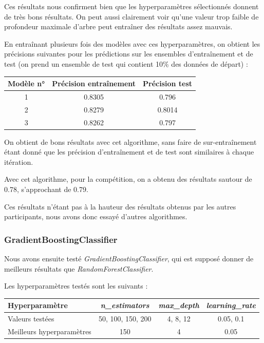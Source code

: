 \documentclass[a4paper]{article}
\begin{document}
    Ces résultats nous confirment bien que les hyperparamètres sélectionnés donnent de très bons résultats.
    On peut aussi clairement voir qu'une valeur trop faible de profondeur maximale d'arbre peut entraîner
    des résultats assez mauvais.

    En entraînant plusieurs fois des modèles avec ces hyperparamètres, on obtient les précisions suivantes pour les prédictions 
    sur les ensembles d'entraînement et de test (on prend un ensemble de test qui contient 10\% des données de départ) :

    \begin{tabular}{| *{3}{c|}}
        \hline
        Modèle n° & Précision entraînement & Précision test
        \tabularnewline
        \hline
        1 & 0.8305 & 0.796
        \tabularnewline
        \hline
        2 & 0.8279 & 0.8014
        \tabularnewline
        \hline
        3 & 0.8262 & 0.797
        \tabularnewline
        \hline
    \end{tabular}

    On obtient de bons résultats avec cet algorithme, sans faire de sur-entraînement étant donné que les précision
    d'entraînement et de test sont similaires à chaque itération.
    
    Avec cet algorithme, pour la compétition, on a obtenu des résultats sautour de 0.78, s'approchant de 0.79.

    Ces résultats n'étant pas à la hauteur des résultats obtenus par les autres participants, nous avons donc essayé d'autres algorithmes.

    \subsubsection{GradientBoostingClassifier}

    Nous avons ensuite testé {\it GradientBoostingClassifier}, qui est supposé donner de meilleurs résultats que {\it RandomForestClassifier}.

    Les hyperparamètres testés sont les suivants :

    \begin{tabular}{| l | *{3}{c|}}
        \hline
        Hyperparamètre & {\it n\_estimators} & {\it max\_depth} & {\it learning\_rate}
        \tabularnewline
        \hline
        Valeurs testées & 50, 100, 150, 200 & 4, 8, 12 & 0.05, 0.1
        \tabularnewline
        \hline
        Meilleurs hyperparamètres & 150 & 4 & 0.05
        \tabularnewline
        \hline
    \end{tabular}
\end{document}
